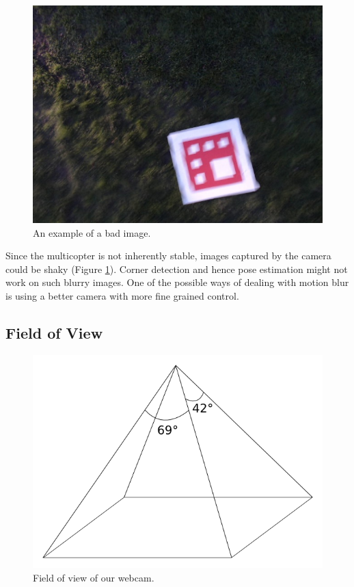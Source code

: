 \documentclass[10pt]{scrartcl} %
\begin{document}
\begin{figure}[h]
    \centering
    \includegraphics[width=\textwidth]{images/badimage.jpg}
    \caption{An example of a bad image.}
    \label{fig:badimage}
\end{figure}

Since the multicopter is not inherently stable, images captured by the camera 
could be shaky (Figure \ref{fig:badimage}). 
Corner detection and hence pose estimation might not work on such blurry images. 
One of the possible ways of dealing with motion blur is using a better camera 
with more fine grained control.

\subsection{Field of View}

\begin{figure}[h]
    \centering
    \includegraphics{images/fov.png}
    \caption{Field of view of our webcam.}
    \label{fig:fov}
\end{figure}
\end{document}
